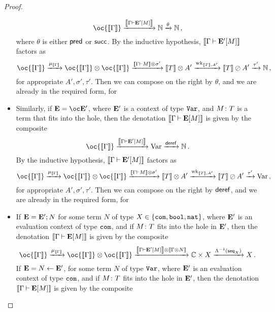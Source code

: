 \documentclass[11pt]{report}
\begin{document}
\begin{proof}
\begin{itemize}
      \[
        \oc {\deno{\Gamma}} \xrightarrow{\deno{\Gamma \ts \EE'[M]}} \bN \xrightarrow{\theta} \bN\,,
        \]
      where $\theta$ is either $\operatorname{{\mathsf{pred}}}$ or $\operatorname{{\mathsf{succ}}}$.
      By the inductive hypothesis, $\left\llbracket\Gamma\mathbin{\vdash}{\mathbf{E}}'[M]\right\rrbracket$ factors as
      \[
        \oc{\deno{\Gamma}} \xrightarrow{\mu_{{\deno{\Gamma}}}} \oc {\deno{\Gamma}} \tensor \oc {\deno{\Gamma}} \xrightarrow{\deno{\Gamma\ts M}\tensor\sigma'} \deno{T}\tensor A' \xrightarrow{\wk_{\deno{T},A'}} \deno{T} \sequoid A' \xrightarrow{\tau'} \bN\,,
        \]
      for appropriate $A',\sigma',\tau'$.  
      Then we can compose on the right by $\theta$, and we are already in the required form, for
    \item Similarly, if $\EE = \oc\EE'$, where ${\mathbf{E}}'$ is a context of type ${\mathtt{Var}}$, and $M\colon T$ is a term that fits into the hole, then the denotation $\left\llbracket\Gamma\mathbin{\vdash}{\mathbf{E}}[M]\right\rrbracket$ is given by the composite
      \[
        \oc {\deno{\Gamma}} \xrightarrow{\deno{\Gamma \ts \EE'[M]}} \Varr \xrightarrow{\dereff} \bN\,.
        \]
      By the inductive hypothesis, $\left\llbracket\Gamma\mathbin{\vdash}{\mathbf{E}}'[M]\right\rrbracket$ factors as
      \[
        \oc{\deno{\Gamma}} \xrightarrow{\mu_{{\deno{\Gamma}}}} \oc {\deno{\Gamma}} \tensor \oc {\deno{\Gamma}} \xrightarrow{\deno{\Gamma\ts M}\tensor\sigma'} \deno{T}\tensor A' \xrightarrow{\wk_{\deno{T},A'}} \deno{T} \sequoid A' \xrightarrow{\tau'} \Varr\,,
        \]
      for appropriate $A',\sigma',\tau'$.  
      Then we can compose on the right by $\operatorname{\mathsf{deref}}$, and we are already in the required form, for
    \item If ${\mathbf{E}}={\mathbf{E}}';N$ for some term $N$ of type $X\in\{{\mathtt{com}},{\mathtt{bool}},{\mathtt{nat}}\}$, where ${\mathbf{E}}'$ is an evaluation context of type ${\mathtt{com}}$, and if $M\colon T$ fits into the hole in ${\mathbf{E}}'$, then the denotation $\left\llbracket\Gamma\mathbin{\vdash}{\mathbf{E}}[M]\right\rrbracket$ is given by the composite
      \[
        \oc{\deno{\Gamma}} \xrightarrow{\mu_{{\deno{\Gamma}}}} \oc{\deno{\Gamma}} \tensor \oc{\deno{\Gamma}} \xrightarrow{\deno{\Gamma\ts\EE'[M]}\tensor\deno{\Gamma\tensor N}} \bC \times X \xrightarrow{\Lambda\inv(\seq_X)} X\,.
        \]
      If ${\mathbf{E}} = N\gets{\mathbf{E}}'$, for some term $N$ of type ${\mathtt{Var}}$, where ${\mathbf{E}}'$ is an evaluation context of type ${\mathtt{com}}$, and if $M\colon T$ fits into the hole in ${\mathbf{E}}'$, then the denotation $\left\llbracket\Gamma\mathbin{\vdash}{\mathbf{E}}[M]\right\rrbracket$ is given by the composite

\end{itemize}
\end{proof}
\end{document}
